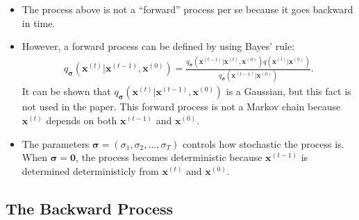 \documentclass[10pt]{article}
\newcommand{\ve}[1]{\mathbf{#1}}
\newcommand{\ves}[1]{\boldsymbol{#1}}
\begin{document}
\begin{itemize}
  \item The process above is not a ``forward'' process per se because it goes backward in time.
  
  \item However, a forward process can be defined by using Bayes' rule:
  \begin{align*}
    q_{\ves{\sigma}}(\ve{x}^{(t)}|\ve{x}^{(t-1)}, \ve{x}^{(0)}) = \frac{q_{\ves{\sigma}}(\ve{x}^{(t-1)}|\ve{x}^{(t)},\ve{x}^{(0)})q(\ve{x}^{(t)}|\ve{x}^{(0)})}{q_{\ves{\sigma}}(\ve{x}^{(t-1)}|\ve{x}^{(0)})}.
  \end{align*}
  It can be shown that $q_{\ves{\sigma}}(\ve{x}^{(t)}|\ve{x}^{(t-1)}, \ve{x}^{(0)})$ is a Gaussian, but this fact is not used in the paper. This forward process is not a Markov chain because $\ve{x}^{(t)}$ depends on both $\ve{x}^{(t-1)}$ and $\ve{x}^{(0)}$.

  \item The parameters $\ves{\sigma} = (\sigma_1, \sigma_2, \dotsc, \sigma_T)$ controls how stochastic the process is. When $\ves{\sigma} = \ve{0}$, the process becomes deterministic because $\ve{x}^{(t-1)}$ is determined deterministicly from $\ve{x}^{(t)}$ and $\ve{x}^{(0)}$.
\end{itemize}

\subsection{The Backward Process}
\end{document}

